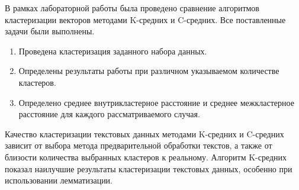 
В рамках лабораторной работы была проведено сравнение алгоритмов кластеризации векторов методами K-средних и C-средних. Все поставленные задачи были выполнены.

\begin{enumerate}[label*=\arabic*)]
	\item Проведена кластеризация заданного набора данных.
	\item Определены результаты работы при различном указываемом количестве кластеров.
	\item Определено среднее внутрикластерное расстояние и среднее межкластерное расстояние для каждого рассматриваемого случая.
\end{enumerate}

Качество кластеризации текстовых данных методами K-средних и C-средних зависит от выбора метода предварительной обработки текстов, а также от близости количества выбранных кластеров к реальному. Алгоритм K-средних показал наилучшие результаты кластеризации текстовых данных, особенно при использовании лемматизации.
